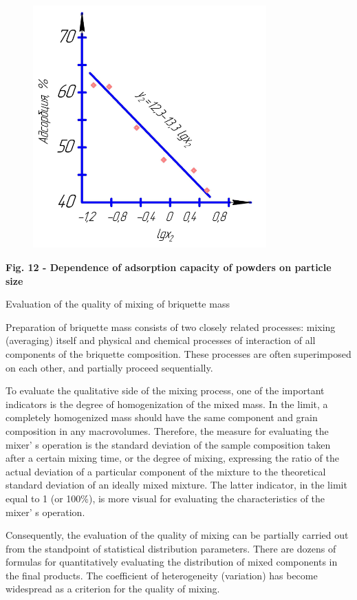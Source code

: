 \begin{figure}[H]
	\centering
	\includegraphics[width=0.8\textwidth]{media/gorn2/image15}
	\caption*{}
\end{figure}


{\bfseries Fig. 12 - Dependence of adsorption capacity of powders on
particle size}

Evaluation of the quality of mixing of briquette mass

Preparation of briquette mass consists of two closely related processes:
mixing (averaging) itself and physical and chemical processes of
interaction of all components of the briquette composition. These
processes are often superimposed on each other, and partially proceed
sequentially.

To evaluate the qualitative side of the mixing process, one of the
important indicators is the degree of homogenization of the mixed mass.
In the limit, a completely homogenized mass should have the same
component and grain composition in any macrovolumes. Therefore, the
measure for evaluating the mixer' s operation is the
standard deviation of the sample composition taken after a certain
mixing time, or the degree of mixing, expressing the ratio of the actual
deviation of a particular component of the mixture to the theoretical
standard deviation of an ideally mixed mixture. The latter indicator, in
the limit equal to 1 (or 100\%), is more visual for evaluating the
characteristics of the mixer' s operation.

Consequently, the evaluation of the quality of mixing can be partially
carried out from the standpoint of statistical distribution parameters.
There are dozens of formulas for quantitatively evaluating the
distribution of mixed components in the final products. The coefficient
of heterogeneity (variation) has become widespread as a criterion for
the quality of mixing.

